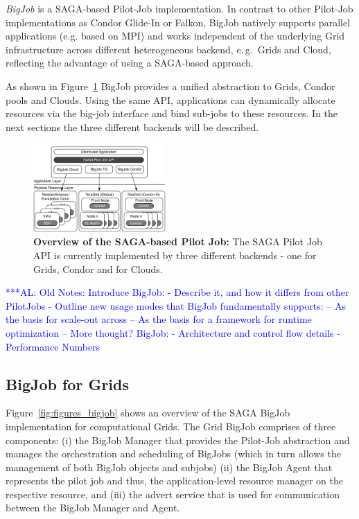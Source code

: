 \documentclass[conference,final]{IEEEtran}
\newcommand{\alnote}[1]{ {\textcolor{blue} { ***AL: #1 }}}
\newcommand{\alnote}[1]{}
\begin{document}
\emph{BigJob} is a SAGA-based Pilot-Job implementation. In contrast to other
Pilot-Job implementations as Condor Glide-In or Falkon, BigJob
natively supports parallel applications (e.g. based on MPI) and works
independent of the underlying Grid infrastructure across different
heterogeneous backend, e.\,g.\ Grids and Cloud, reflecting the
advantage of using a SAGA-based approach. 

As shown in Figure~\ref{fig:figures_distributed_pilot_job} BigJob provides
a unified abstraction to Grids, Condor pools and Clouds. Using the same API,
applications can dynamically allocate resources via the big-job interface and
bind sub-jobs to these resources. In the next sections the three different backends
will be described.
\begin{figure}[htbp]
    \centering
        \includegraphics[width=0.45\textwidth]{figures/distributed_pilot_job}
    \caption{\textbf{Overview of the SAGA-based Pilot Job:} The SAGA Pilot Job API is
    currently implemented by three different backends - one for Grids, Condor and 
    for Clouds.}
    \label{fig:figures_distributed_pilot_job}
\end{figure}

\alnote{Old Notes: 
Introduce BigJob:
 - Describe it, and how it differs from other PilotJobs
 - Outline new usage modes that BigJob fundamentally supports:
    -- As the basis for scale-out across
    -- As the basis for a framework for runtime optimization
    -- More thought?
BigJob:
 - Architecture and control flow details
 - Performance Numbers}

\subsection{BigJob for Grids}

Figure~\ref{fig:figures_bigjob} shows an overview of the SAGA BigJob 
implementation for computational Grids. The Grid BigJob comprises 
of three components: (i) the BigJob Manager that
provides the Pilot-Job abstraction and manages the orchestration and
scheduling of BigJobs (which in turn allows the management of both
BigJob objects and subjobs) (ii) the BigJob Agent that represents the
pilot job and thus, the application-level resource manager on the
respective resource, and (iii) the advert service that is used for
communication between the BigJob Manager and Agent.
\end{document}
